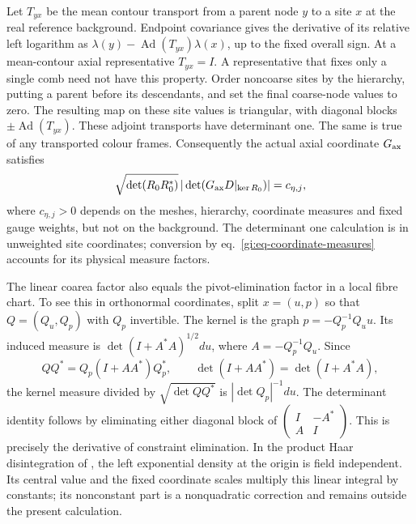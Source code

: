 \documentclass[11pt,letterpaper,reqno]{amsart}
\numberwithin{equation}{section}
\renewcommand{\eqref}[1]{\textup{eq.~\ref{#1}}}
\theoremstyle{definition}
\theoremstyle{remark}
\begin{document}
Let $T_{yx}$ be the mean contour transport from a parent
node $y$ to a site $x$ at the real reference background.
Endpoint covariance gives the derivative of its relative
left logarithm as
$\lambda(y)-\operatorname{Ad}(T_{yx})\lambda(x)$,
up to the fixed overall sign. At a mean-contour axial
representative $T_{yx}=I$. A representative that fixes
only a single comb need not have this property.
Order noncoarse sites by the hierarchy, putting a parent
before its descendants, and set the final coarse-node
values to zero. The resulting map on these site values
is triangular, with diagonal blocks
$\pm\operatorname{Ad}(T_{yx})$. These adjoint transports
have determinant one. The same is true of any transported
colour frames.
Consequently the actual axial coordinate $G_{\rm ax}$
satisfies
\begin{equation}\label{gi:eq-axial-constant}
 \sqrt{\det(R_0R_0^*)}\,
   |\det(G_{\rm ax}D|_{\ker R_0})|=c_{\eta,j},
\end{equation}
where $c_{\eta,j}>0$ depends on the meshes, hierarchy,
coordinate measures and fixed gauge weights, but not
on the background. The determinant one calculation is
in unweighted site coordinates; conversion by
\eqref{gi:eq-coordinate-measures} accounts for its
physical measure factors.

The linear coarea factor also equals the pivot-elimination
factor in a local fibre chart. To see this in orthonormal
coordinates, split $x=(u,p)$ so that
$Q=(Q_u,Q_p)$ with $Q_p$ invertible. The kernel is the
graph $p=-Q_p^{-1}Q_u u$. Its induced measure is
$\det(I+A^*A)^{1/2}du$, where $A=-Q_p^{-1}Q_u$.
Since
\[
 QQ^*=Q_p(I+AA^*)Q_p^*,\qquad
                  \det(I+AA^*)=\det(I+A^*A),
\]
the kernel measure divided by $\sqrt{\det QQ^*}$ is
$|\det Q_p|^{-1}du$. The determinant identity follows
by eliminating either diagonal block of
$\left(\begin{smallmatrix}I&-A^*\\A&I\end{smallmatrix}\right)$.
This is precisely the derivative of constraint
elimination. In the product Haar disintegration of
\cite[Proposition ``Local disintegration of product Haar
measure'']{BA}, the left exponential density at the
origin is field independent. Its central value and the
fixed coordinate scales multiply this linear integral
by constants; its nonconstant part is a nonquadratic
correction and remains outside the present calculation.
\end{document}
